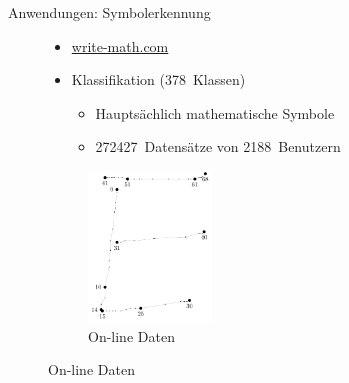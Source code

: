 \begin{frame}{Anwendungen: Symbolerkennung}
    \begin{figure}[ht]
        \begin{minipage}[b]{0.45\linewidth}
            \begin{itemize}
                \item \href{http://write-math.com}{write-math.com}
                \item Klassifikation (378~Klassen)
                \begin{itemize}
                    \item Hauptsächlich mathematische Symbole
                    \item \num{272427}~Datensätze von \num{2188}~Benutzern
                \end{itemize}
            \end{itemize}
            \vspace{2cm}
        \end{minipage}
        \hspace{0.5cm}
        \begin{minipage}[b]{0.45\linewidth}
            \centering
                \begin{figure}[H]
                    \includegraphics[height=4cm]{../images/handwritten-symbol}
                    \caption{On-line Daten}
                    \label{fig:Klassifikation}
                \end{figure}
        \end{minipage}
    \end{figure}
\end{frame}


